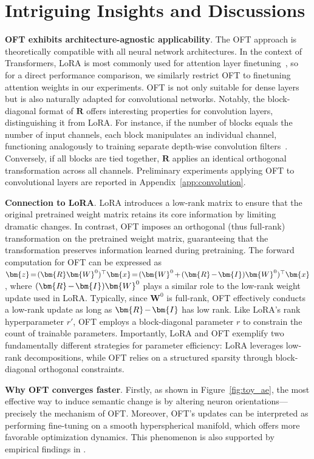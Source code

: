 \section{Intriguing Insights and Discussions}

\textbf{OFT exhibits architecture-agnostic applicability}. The OFT approach is theoretically compatible with all neural network architectures. In the context of Transformers, LoRA is most commonly used for attention layer finetuning~\cite{hulora2022}, so for a direct performance comparison, we similarly restrict OFT to finetuning attention weights in our experiments. OFT is not only suitable for dense layers but is also naturally adapted for convolutional networks. Notably, the block-diagonal format of $\bm{R}$ offers interesting properties for convolution layers, distinguishing it from LoRA. For instance, if the number of blocks equals the number of input channels, each block manipulates an individual channel, functioning analogously to training separate depth-wise convolution filters~\cite{chollet2017xception}. Conversely, if all blocks are tied together, $\bm{R}$ applies an identical orthogonal transformation across all channels. Preliminary experiments applying OFT to convolutional layers are reported in Appendix~\ref{app:convolution}.

\textbf{Connection to LoRA}. LoRA introduces a low-rank matrix to ensure that the original pretrained weight matrix retains its core information by limiting dramatic changes. In contrast, OFT imposes an orthogonal (thus full-rank) transformation on the pretrained weight matrix, guaranteeing that the transformation preserves information learned during pretraining. The forward computation for OFT can be expressed as $\thickmuskip=2mu \medmuskip=2mu \bm{z}=(\bm{R}\bm{W}^0)^\top\bm{x}=(\bm{W}^0+(\bm{R}-\bm{I})\bm{W}^0)^\top\bm{x}$, where $\thickmuskip=2mu \medmuskip=2mu (\bm{R}-\bm{I})\bm{W}^0$ plays a similar role to the low-rank weight update used in LoRA. Typically, since $\bm{W}^0$ is full-rank, OFT effectively conducts a low-rank update as long as $\thickmuskip=2mu \medmuskip=2mu \bm{R}-\bm{I}$ has low rank. Like LoRA’s rank hyperparameter $r'$, OFT employs a block-diagonal parameter $r$ to constrain the count of trainable parameters. Importantly, LoRA and OFT exemplify two fundamentally different strategies for parameter efficiency: LoRA leverages low-rank decompositions, while OFT relies on a structured sparsity through block-diagonal orthogonal constraints.

\textbf{Why OFT converges faster}. Firstly, as shown in Figure~\ref{fig:toy_ae}, the most effective way to induce semantic change is by altering neuron orientations—precisely the mechanism of OFT. Moreover, OFT’s updates can be interpreted as performing fine-tuning on a smooth hyperspherical manifold, which offers more favorable optimization dynamics. This phenomenon is also supported by empirical findings in \cite{liu2021orthogonal}.


